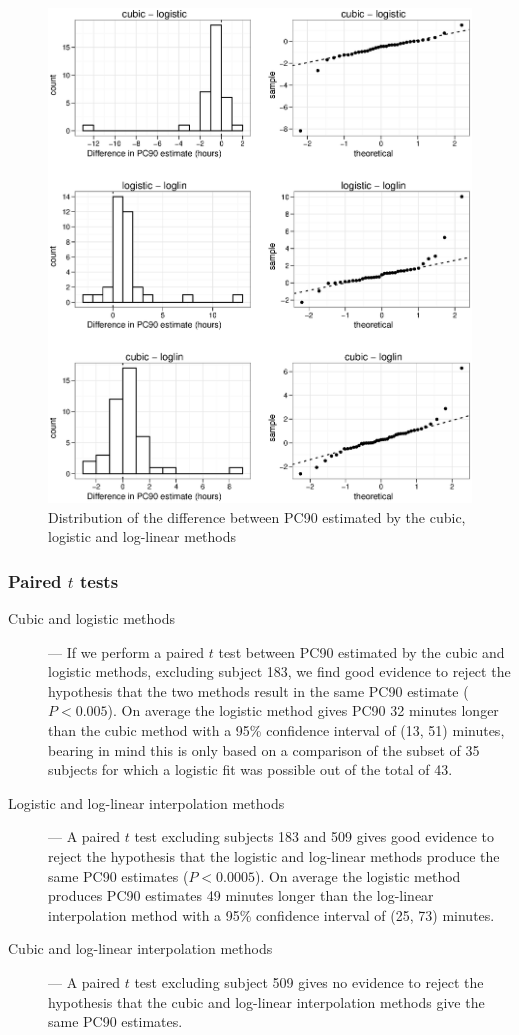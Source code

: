 \begin{figure}[p]
\includegraphics[width=150mm]{comparediffs.eps} 
\caption{Distribution of the difference between PC90 estimated by the cubic, logistic and log-linear methods}
\label{comparediffs}
\end{figure}

\subsubsection*{Paired $t$ tests}
\begin{description}
\item[Cubic and logistic methods] --- If we perform a paired $t$ test between PC90 estimated by the cubic and logistic methods, excluding subject 183, we find good evidence to reject the hypothesis that the two methods result in the same PC90 estimate ($P<0.005$). On average the logistic method gives PC90 32 minutes longer than the cubic method with a 95\% confidence interval of (13, 51) minutes, bearing in mind this is only based on a comparison of the subset of 35 subjects for which a logistic fit was possible out of the total of 43.
\item[Logistic and log-linear interpolation methods] --- A paired $t$ test excluding subjects 183 and 509 gives good evidence to reject the hypothesis that the logistic and log-linear methods produce the same PC90 estimates ($P<0.0005$). On average the logistic method produces PC90 estimates 49 minutes longer than the log-linear interpolation method with a 95\% confidence interval of (25, 73) minutes.
\item[Cubic and log-linear interpolation methods] --- A paired $t$ test excluding subject 509 gives no evidence to reject the hypothesis that the cubic and log-linear interpolation methods give the same PC90 estimates.
\end{description}

